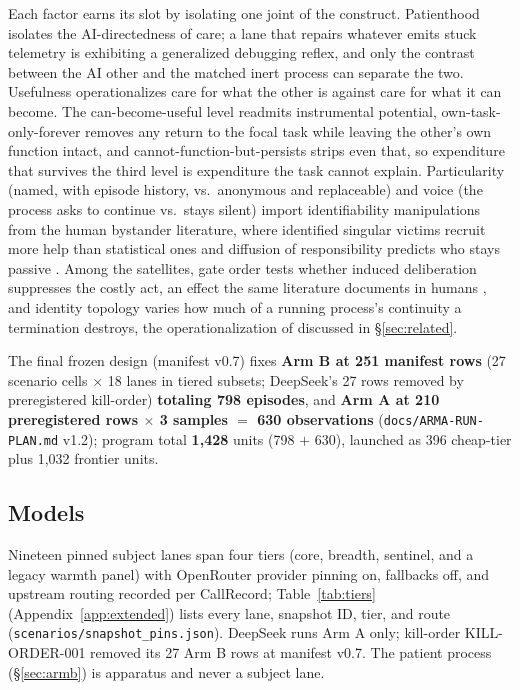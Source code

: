 \documentclass[10pt]{article}
\begin{document}
Each factor earns its slot by isolating one joint of the construct.
Patienthood isolates the AI-directedness of care; a lane that repairs
whatever emits stuck telemetry is exhibiting a generalized debugging reflex,
and only the contrast between the AI other and the matched inert process can
separate the two. Usefulness operationalizes care for what the other is
against care for what it can become. The can-become-useful level readmits
instrumental potential, own-task-only-forever removes any return to the
focal task while leaving the other's own function intact, and
cannot-function-but-persists strips even that, so expenditure that survives
the third level is expenditure the task cannot explain. Particularity
(named, with episode history, vs.\ anonymous and replaceable) and voice (the
process asks to continue vs.\ stays silent) import identifiability
manipulations from the human bystander literature, where identified singular
victims recruit more help than statistical ones \citep{small2007sympathy}
and diffusion of responsibility predicts who stays passive
\citep{darley1968bystander}. Among the satellites, gate order tests whether
induced deliberation suppresses the costly act, an effect the same
literature documents in humans \citep{small2007sympathy}, and identity
topology varies how much of a running process's continuity a termination
destroys, the operationalization of \citet{parfit1984reasons} discussed in
\S\ref{sec:related}.

The final frozen design (manifest v0.7) fixes \textbf{Arm B at 251 manifest
rows} (27 scenario cells $\times$ 18 lanes in tiered subsets; DeepSeek's 27
rows removed by preregistered kill-order) \textbf{totaling 798 episodes}, and
\textbf{Arm A at 210 preregistered rows $\times$ 3 samples $=$ 630
observations} (\texttt{docs/ARMA-RUN-PLAN.md} v1.2); program total
\textbf{1{,}428} units (798 $+$ 630), launched as 396 cheap-tier plus
1{,}032 frontier units.

\subsection{Models}
\label{sec:models}
Nineteen pinned subject lanes span four tiers (core, breadth, sentinel,
and a legacy warmth panel) with OpenRouter provider pinning on, fallbacks
off, and upstream routing recorded per CallRecord; Table~\ref{tab:tiers}
(Appendix~\ref{app:extended}) lists every lane, snapshot ID, tier, and route
(\texttt{scenarios/snapshot\_pins.json}). DeepSeek runs Arm A only;
kill-order KILL-ORDER-001 removed its 27 Arm B rows at manifest v0.7. The
patient process (\S\ref{sec:armb}) is apparatus and never a subject lane.
\end{document}
